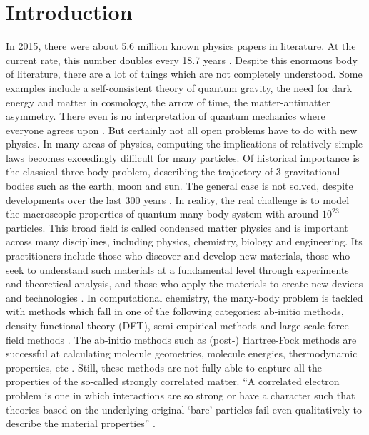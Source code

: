 
\section{Introduction}

In 2015, there were about 5.6 million known physics papers in literature. At the current rate, this number doubles every 18.7 years \cite{Sinatra2015}. Despite this enormous body of literature, there are a lot of things which are not completely understood. Some examples include a self-consistent theory of quantum gravity, the need for dark energy and matter in cosmology, the arrow of time, the matter-antimatter asymmetry. There even is no interpretation of quantum mechanics where everyone agrees upon \cite{Lulea2015}.
But certainly not all open problems have to do with new physics. In many areas of physics, computing the implications of relatively simple laws becomes exceedingly difficult for many particles. Of historical importance is the classical three-body problem, describing the trajectory of 3 gravitational bodies such as the earth, moon and sun. The general case is not solved, despite developments over the last 300 years \cite{Musielak2014}.
In reality, the real challenge is to model the macroscopic properties of quantum many-body system with around $10^{23}$ particles. This broad field is called condensed matter physics and is important across many disciplines, including physics, chemistry, biology and engineering. Its practitioners include those who discover and develop new materials, those who seek to understand such materials at a fundamental level through experiments and theoretical analysis, and those who apply the materials to create new devices and technologies  \cite{Mora-Aznar2000}.
In computational chemistry, the many-body problem is tackled with methods which fall in one of the following categories: ab-initio methods, density functional theory (DFT), semi-empirical methods and large scale force-field methods \cite{Lewars2011}. The ab-initio methods such as (post-) Hartree-Fock methods are successful at calculating molecule geometries, molecule energies, thermodynamic properties, etc \cite{Lewars2011}.
Still, these methods are not fully able to capture all the properties of the so-called strongly correlated matter. ``A correlated electron problem is one in which interactions are so strong or have a character such that theories based on the underlying original `bare' particles fail even qualitatively to describe the material properties'' \cite{Alexandradinata2020}.
